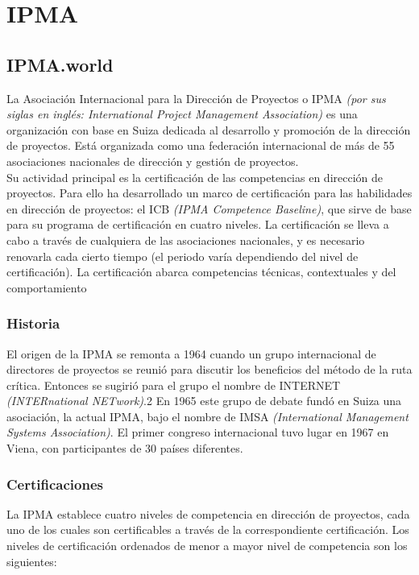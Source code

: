\section{IPMA}

\subsection{IPMA.world}

La Asociación Internacional para la Dirección de Proyectos o IPMA \emph{(por sus siglas en inglés: International Project Management Association)} es una organización con base en Suiza dedicada al desarrollo y promoción de la dirección de proyectos. Está organizada como una federación internacional de más de 55 asociaciones nacionales de dirección y gestión de proyectos.\\

Su actividad principal es la certificación de las competencias en dirección de proyectos. Para ello ha desarrollado un marco de certificación para las habilidades en dirección de proyectos: el ICB \emph{(IPMA Competence Baseline)}, que sirve de base para su programa de certificación en cuatro niveles. La certificación se lleva a cabo a través de cualquiera de las asociaciones nacionales, y es necesario renovarla cada cierto tiempo (el periodo varía dependiendo del nivel de certificación). La certificación abarca competencias técnicas, contextuales y del comportamiento

\subsubsection{Historia}

El origen de la IPMA se remonta a 1964 cuando un grupo internacional de directores de proyectos se reunió para discutir los beneficios del método de la ruta crítica. Entonces se sugirió para el grupo el nombre de INTERNET \emph{(INTERnational NETwork)}.2 En 1965 este grupo de debate fundó en Suiza una asociación, la actual IPMA, bajo el nombre de IMSA \emph{(International Management Systems Association)}. El primer congreso internacional tuvo lugar en 1967 en Viena, con participantes de 30 países diferentes.

\subsubsection{Certificaciones}

La IPMA establece cuatro niveles de competencia en dirección de proyectos, cada uno de los cuales son certificables a través de la correspondiente certificación. Los niveles de certificación ordenados de menor a mayor nivel de competencia son los siguientes:\\

